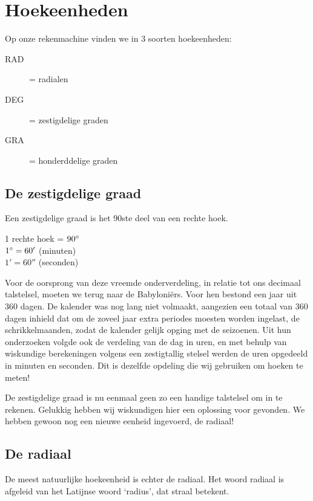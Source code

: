\documentclass[a4paper,12pt,twoside]{article}
\begin{document}

\pagestyle{fancy}
\fancyhead[RE,LO]{}

\cleardoublepage
\section{Hoekeenheden}

Op onze rekenmachine vinden we in  3 soorten hoekeenheden:

\begin{description}
\item[RAD] = radialen
\item[DEG] = zestigdelige graden
\item[GRA] = honderddelige graden
\end{description}

\subsection{De zestigdelige graad}
Een zestigdelige graad is het 90ste deel van een rechte hoek.
\begin{center}
1 rechte hoek = $90^\circ$\\
$1^\circ = 60'$ (minuten)\\
$1' = 60''$ (seconden)\\
\end{center}
Voor de oorsprong van deze vreemde onderverdeling, in relatie tot ons decimaal talstelsel, moeten we terug naar de Babyloniërs. Voor hen bestond een jaar uit 360 dagen. De kalender was nog lang niet volmaakt, aangezien een totaal van 360 dagen inhield dat om de zoveel jaar extra periodes moesten worden ingelast, de schrikkelmaanden, zodat de kalender gelijk opging met de seizoenen. Uit hun onderzoeken volgde ook de verdeling van de dag in uren, en met behulp van wiskundige berekeningen volgens een zestigtallig stelsel werden de uren opgedeeld in minuten en seconden.
Dit is dezelfde opdeling die wij gebruiken om hoeken te meten!

De zestigdelige graad is nu eenmaal geen zo een handige talstelsel om in te rekenen. Gelukkig hebben wij wiskundigen hier een oplossing voor gevonden. We hebben gewoon nog een nieuwe eenheid ingevoerd, de radiaal!

\subsection{De radiaal}
De meest natuurlijke hoekeenheid is echter de radiaal. Het woord radiaal is afgeleid van het Latijnse woord ‘radius’, dat straal betekent.
\end{document}
